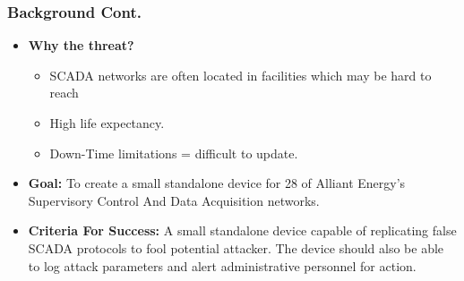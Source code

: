\begin{frame}
\frametitle{Background Cont.}


\begin{itemize}
\item \textbf{Why the threat? } \begin{itemize}\item SCADA networks are often located in facilities which may be hard to reach
\item High life expectancy.
\item Down-Time limitations = difficult to update.
\end{itemize} 
\item \textbf{Goal: }To create a small standalone device for 28 of Alliant Energy's Supervisory Control  And Data Acquisition networks.
\item \textbf{Criteria For Success: }A small standalone device capable of replicating false  SCADA protocols to fool potential attacker.  The device should also be able to log  attack parameters and alert administrative personnel for action.
\end{itemize}


\end{frame}

